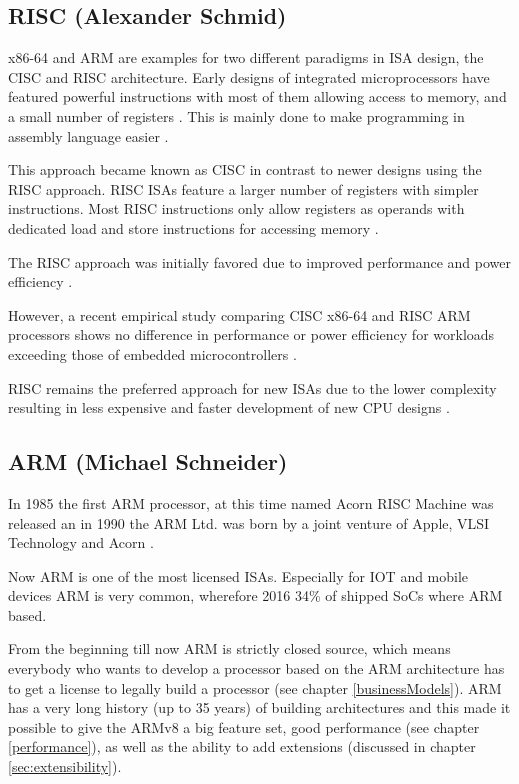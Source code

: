 \documentclass[conference]{IEEEtran}
\begin{document}
	\subsection{RISC (Alexander Schmid)}
	x86-64 and ARM are examples for two different paradigms in \gls{ISA} design, the \gls{CISC} and \gls{RISC} architecture.
	Early designs of integrated microprocessors have featured powerful instructions with most of them allowing access to memory,
	and a small number of registers \cite{George1990}. This is mainly done to make programming in assembly language easier \cite[page 73]{Stokes2006}.

	This approach became known as \gls{CISC} in contrast to newer designs using the \gls{RISC} approach.
	\gls{RISC} \glspl{ISA} feature a larger number of registers with simpler instructions.
	Most \gls{RISC} instructions only allow registers as operands with dedicated load and store instructions for accessing memory \cite{George1990}.

	The \gls{RISC} approach was initially favored due to improved performance and power efficiency \cite{George1990}.
	
	However, a recent empirical study comparing \gls{CISC} x86-64 and \gls{RISC} ARM processors shows no difference in performance or power efficiency
	for workloads exceeding those of embedded microcontrollers \cite{Blem2013}.

	\gls{RISC} remains the preferred approach for new \glspl{ISA} due to the lower complexity resulting in less expensive and faster
	development of new CPU designs \cite{George1990}. 

	\subsection{ARM (Michael Schneider)}
	In 1985 the first ARM processor, at this time named Acorn RISC Machine was released an in 1990 the ARM Ltd. was born by a joint venture of Apple, VLSI Technology and Acorn \cite{Levy2005}.

	 Now ARM is one of the most licensed \glspl{ISA}. Especially for IOT and mobile devices ARM is very common, wherefore 2016 34\% of shipped SoCs where ARM based. \cite[slide 7-10]{Holdings2018}

	From the beginning till now ARM is strictly closed source, which means everybody who wants to develop a processor based on the ARM architecture has to get a license to legally build a processor (see chapter \ref{businessModels}). ARM has a very long history (up to 35 years) of building architectures and this made it possible to give the ARMv8 a big feature set, good performance (see chapter \ref{performance}), as well as the ability to add extensions (discussed in chapter \ref{sec:extensibility}).
	
\end{document}
